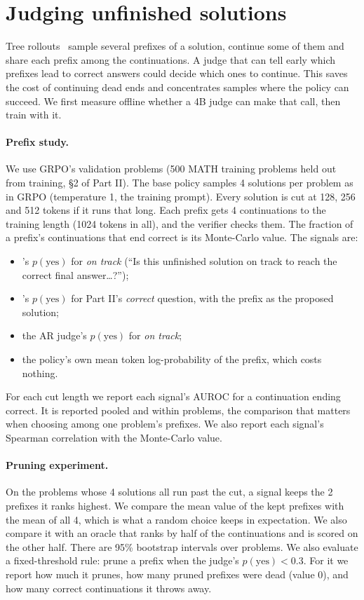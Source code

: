 
\section{Judging unfinished solutions}\label{sec:prefix}

Tree rollouts~\cite{hou2025treerl} sample several prefixes of a solution, continue some of them and share each prefix
among the continuations. A judge that can tell early which prefixes lead to correct answers could decide which ones to
continue. This saves the cost of continuing dead ends and concentrates samples where the policy can succeed. We first
measure offline whether a 4B judge can make that call, then train with it.

\paragraph{Prefix study.} We use GRPO's validation problems (500 MATH training problems held out from training,
\S2 of Part II). The base policy samples 4 solutions per problem as in GRPO (temperature 1, the training prompt). Every
solution is cut at 128, 256 and 512 tokens if it runs that long. Each prefix gets 4 continuations to the training
length (1024 tokens in all), and the verifier checks them. The fraction of a prefix's continuations that end correct is
its Monte-Carlo value. The signals are:
\begin{itemize}
\item \kev{}'s $p(\text{yes})$ for \emph{on track} (``Is this unfinished solution on track to reach the correct final
  answer\ldots?'');
\item \kev{}'s $p(\text{yes})$ for Part II's \emph{correct} question, with the prefix as the proposed solution;
\item the AR judge's $p(\text{yes})$ for \emph{on track};
\item the policy's own mean token log-probability of the prefix, which costs nothing.
\end{itemize}
For each cut length we report each signal's AUROC for a continuation ending correct. It is reported pooled and within
problems, the comparison that matters when choosing among one problem's prefixes. We also report each signal's
Spearman correlation with the Monte-Carlo value.

\paragraph{Pruning experiment.} On the problems whose 4 solutions all run past the cut, a signal keeps the 2 prefixes
it ranks highest. We compare the mean value of the kept prefixes with the mean of all 4, which is what a random choice
keeps in expectation. We also compare it with an oracle that ranks by half of the continuations and is scored on the
other half. There are 95\% bootstrap intervals over problems. We also evaluate a fixed-threshold rule:
prune a prefix when the judge's $p(\text{yes})<0.3$. For it we report how much it prunes, how many pruned prefixes were
dead (value 0), and how many correct continuations it throws away.

